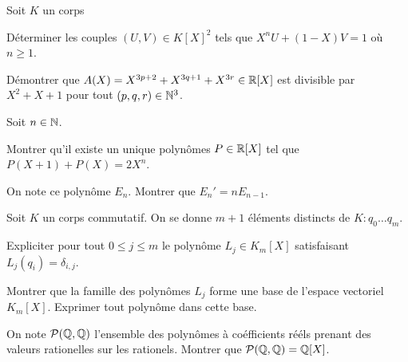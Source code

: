 \documentclass[french]{report}
\begin{document}
\begin{exo}
    Soit \(K\) un corps
    \begin{q}{1}
        Déterminer les couples \(\left(U, V\right)\in K[X]^2\) tels que
        \(X^nU+\left(1-X\right)V=1\) où \(n\geq 1\).
    \end{q}
    \begin{q}{2}
        Démontrer que \(A(X)=X^{3p+2}+X^{3q+1}+X^{3r}\in\mathbb{R}[X]\) est divisible
        par \(X^2+X+1\) pour tout \(\left(p,q,r\right)\in\mathbb{N}^3\).
    \end{q}
\end{exo}

\begin{exo}
    Soit \(n\in\mathbb{N}\).
    \begin{q}{1}
        Montrer qu'il existe un unique polynômes \(P\in\mathbb{R}[X]\) tel que
        \(P(X+1)+P(X) = 2X^n\).
    \end{q}
    \begin{q}{2}
        On note ce polynôme \(E_n\). Montrer que \(E_n'=nE_{n-1}\).
    \end{q}
\end{exo}

\begin{exo}
    Soit \(K\) un corps commutatif. On se donne \(m+1\) éléments distincts de \(K\colon
    q_0\dots q_m\).
    \begin{q}{1}
        Expliciter pour tout \(0\leq j\leq m\) le polynôme \(L_j\in K_m[X]\)
        satisfaisant \(L_j(q_i) = \delta_{i,j}\).
    \end{q}
    \begin{q}{2}
        Montrer que la famille des polynômes \(L_j\) forme une base de l'espace vectoriel
        \(K_m[X]\). Exprimer tout polynôme dans cette base.
    \end{q}
    \begin{q}{3}
        On note \(\mathcal{P}(\mathbb{Q}, \mathbb{Q})\) l'ensemble des polynômes à coéfficients rééls prenant des valeurs
        rationelles sur les rationels. Montrer que \(\mathcal{P}(\mathbb{Q}, \mathbb{Q})=\mathbb{Q}[X]\).
    \end{q}
\end{exo}
\end{document}
